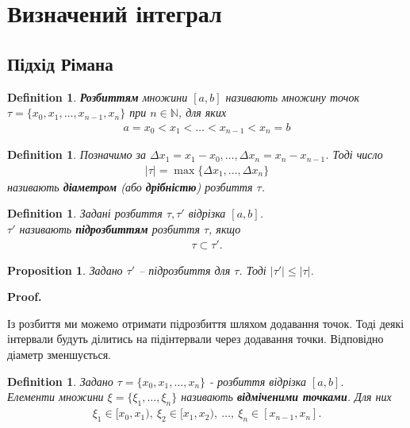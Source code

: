 \documentclass[a4paper, 10pt]{article}
\makeatletter
\def\qed{$\blacksquare$}
\theoremstyle{theoremdd}
\theoremstyle{theoremdd}
\theoremstyle{theoremdd}
\newtheorem{definition}[theorem]{Definition}
\theoremstyle{theoremdd}
\theoremstyle{theoremdd}
\theoremstyle{theoremdd}
\newtheorem{proposition}[theorem]{Proposition}
\theoremstyle{theoremdd}
\theoremstyle{theoremdd}
\theoremstyle{theoremdd}
\renewenvironment{proof}[1][Proof.\\]{\par
\pushQED{\hfill \qed}%
\normalfont \topsep6\p@\@plus6\p@\relax
\trivlist
\item\relax
{\bfseries
#1\@addpunct{.}}\hspace\labelsep\ignorespaces
}{%
\popQED\endtrivlist\@endpefalse
}
\makeatother
\begin{document}
\newpage
\fi

\iffalse
\section{Визначений інтеграл}
\subsection{Підхід Рімана}
\begin{definition}
\textbf{Розбиттям} множини $[a,b]$ називають множину точок $\tau = \{x_0,x_1,\dots,x_{n-1},x_n\}$ при $n \in \mathbb{N}$, для яких
\begin{align*}
a = x_0 < x_1 < \dots < x_{n-1} < x_{n} = b
\end{align*}
\end{definition}

\begin{definition}
Позначимо за $\Delta x_1 = x_1 - x_0, \dots, \Delta x_n = x_{n} - x_{n-1}$. Тоді число
\begin{align*}
|\tau| = \max\{\Delta x_1,\dots, \Delta x_n\}
\end{align*}
називають \textbf{діаметром} (або \textbf{дрібністю}) розбиття $\tau$.
\end{definition}

\begin{definition}
Задані розбиття $\tau, \tau'$ відрізка $[a,b]$.\\
$\tau'$ називають \textbf{підрозбиттям} розбиття $\tau$, якщо
\begin{align*}
\tau \subset \tau'.
\end{align*}
\end{definition}

\begin{proposition}
Задано $\tau'$ -- підрозбиття для $\tau$. Тоді $|\tau'| \leq |\tau|$.
\end{proposition}

\begin{proof}
Із розбиття ми можемо отримати підрозбиття шляхом додавання точок. Тоді деякі інтервали будуть ділитись на підінтервали через додавання точки. Відповідно діаметр зменшується.
\end{proof}

\begin{definition}
Задано $\tau = \{x_0,x_1,\dots,x_n\}$ - розбиття відрізка $[a,b]$.\\
Елементи множини $\xi = \{\xi_1, \dots, \xi_n \}$ називають \textbf{відміченими точками}. Для них
\begin{align*}
\xi_1 \in [x_0,x_1),\ \xi_2 \in [x_1,x_2),\ \dots,\ \xi_n \in [x_{n-1}, x_n].
\end{align*}
\end{definition}
\end{document}
